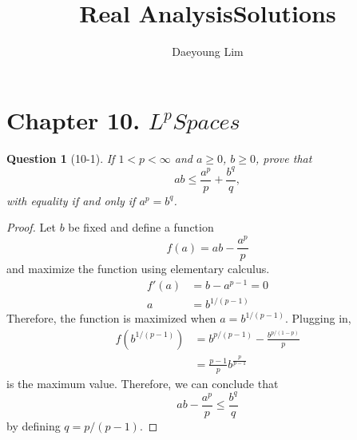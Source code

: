 \documentclass[11pt]{article}
\title{\vspace{-50pt}
\huge Real Analysis\hfill Solutions}
\author{Daeyoung Lim}
\date{}
\theoremstyle{quest}
\newtheorem*{question}{Question}
\begin{document}
\maketitle
{}
\section*{Chapter 10. $L^{p} Spaces$}
\begin{question}[10-1]
  If $1 < p < \infty$ and $a \geq 0$, $b \geq 0$, prove that
  \begin{equation}
    ab \leq \frac{a^{p}}{p} + \frac{b^{q}}{q},
  \end{equation}
  with equality if and only if $a^{p}=b^{q}$.
\end{question}

\begin{proof}
  Let $b$ be fixed and define a function
  \begin{equation}
    f\left(a\right) = ab-\frac{a^{p}}{p}
  \end{equation}
  and maximize the function using elementary calculus.
  \begin{align*}
    f'\left(a\right) &= b - a^{p-1}=0\\
    a &= b^{1/\left(p-1\right)}
  \end{align*}
  Therefore, the function is maximized when $a = b^{1/\left(p-1\right)}$. Plugging in,
  \begin{align*}
    f\left(b^{1/\left(p-1\right)}\right) &= b^{p/\left(p-1\right)} - \frac{b^{p/\left(1-p\right)}}{p}\\
    &= \frac{p-1}{p}b^{\frac{p}{p-1}}
  \end{align*}
  is the maximum value. Therefore, we can conclude that
  \begin{equation}
    ab-\frac{a^{p}}{p} \leq \frac{b^{q}}{q}
  \end{equation}
  by defining $q = p/\left(p-1\right)$.
\end{proof}
\end{document}
